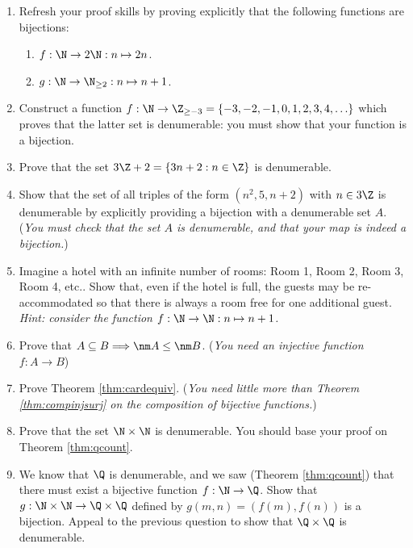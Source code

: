 \begin{enumerate}\renewcommand{\labelenumi}{\thesubsection.\theenumi}
  \item Refresh your proof skills by proving explicitly that the following functions are bijections:
  \begin{enumerate}
    \item $f:\N\to 2\N:n\mapsto 2n$.
    \item $g:\N\to\N_{\ge 2}:n\mapsto n+1$.
  \end{enumerate}
  
	\item Construct a function $f:\N\to\Z_{\ge -3}=\{-3,-2,-1,0,1,2,3,4,\ldots\}$ which proves that the latter set is denumerable: you must show that your function is a bijection.
	
  \item Prove that the set $3\Z+2=\{3n+2:n\in\Z\}$ is denumerable.
	
	\item Show that the set of all triples of the form $(n^2,5,n+2)$ with $n\in 3\Z$ is denumerable by explicitly providing a bijection with a denumerable set $A$. (\emph{You must check that the set $A$ is denumerable, and that your map is indeed a bijection.})

	\item Imagine a hotel with an infinite number of rooms: Room 1, Room 2, Room 3, Room 4, etc.. Show that, even if the hotel is full, the guests may be re-accommodated so that there is always a room free for one additional guest.\\
\emph{Hint: consider the function $f:\N\to\N:n\mapsto n+1$.}
	
	\item Prove that $A\subseteq B\Longrightarrow \nm A\le\nm B$. (\emph{You need an injective function $f:A\to B$})
		
	\item Prove Theorem \ref{thm:cardequiv}. (\emph{You need little more than Theorem \ref{thm:compinjsurj} on the composition of bijective functions.})

	\item Prove that the set $\N\times\N$ is denumerable. You should base your proof on Theorem \ref{thm:qcount}.

	\item We know that $\Q$ is denumerable, and we saw (Theorem \ref{thm:qcount}) that there must exist a bijective function $f:\N\to\Q$. Show that $g:\N\times\N\to\Q\times\Q$ defined by $g(m,n)=(f(m),f(n))$ is a bijection. Appeal to the previous question to show that $\Q\times\Q$ is denumerable.
	

\end{enumerate}
